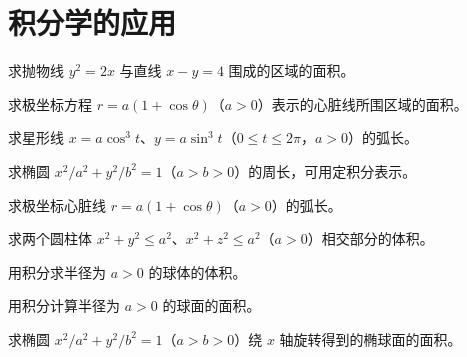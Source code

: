 \renewcommand{\thesection}{\arabic{section}}\renewcommand{\theHsection}{chapter.\arabic{section}}\setcounter{section}{6}\section{积分学的应用}
\noindent\begin{minipage}{\textwidth}
求抛物线 $y^2=2x$ 与直线 $x-y=4$ 围成的区域的面积。
\end{minipage}\par\vfill
\noindent\begin{minipage}{\textwidth}
求极坐标方程 $r=a(1+\cos\theta)$（$a>0$）表示的心脏线所围区域的面积。
\end{minipage}\par\vfill
\noindent\begin{minipage}{\textwidth}
求星形线 $x=a\cos^3t$、$y=a\sin^3t$（$0\le t\le2\pi$，$a>0$）的弧长。
\end{minipage}\par\vfill
\newpage
\noindent\begin{minipage}{\textwidth}
求椭圆 $x^2/a^2+y^2/b^2=1$（$a>b>0$）的周长，可用定积分表示。
\end{minipage}\par\vfill
\noindent\begin{minipage}{\textwidth}
求极坐标心脏线 $r=a(1+\cos\theta)$（$a>0$）的弧长。
\end{minipage}\par\vfill
\noindent\begin{minipage}{\textwidth}
求两个圆柱体 $x^2+y^2\le a^2$、$x^2+z^2\le a^2$（$a>0$）相交部分的体积。
\end{minipage}\par\vfill
\newpage
\noindent\begin{minipage}{\textwidth}
用积分求半径为 $a>0$ 的球体的体积。
\end{minipage}\par\vfill
\noindent\begin{minipage}{\textwidth}
用积分计算半径为 $a>0$ 的球面的面积。
\end{minipage}\par\vfill
\noindent\begin{minipage}{\textwidth}
求椭圆 $x^2/a^2+y^2/b^2=1$（$a>b>0$）绕 $x$ 轴旋转得到的椭球面的面积。
\end{minipage}\par\vfill
